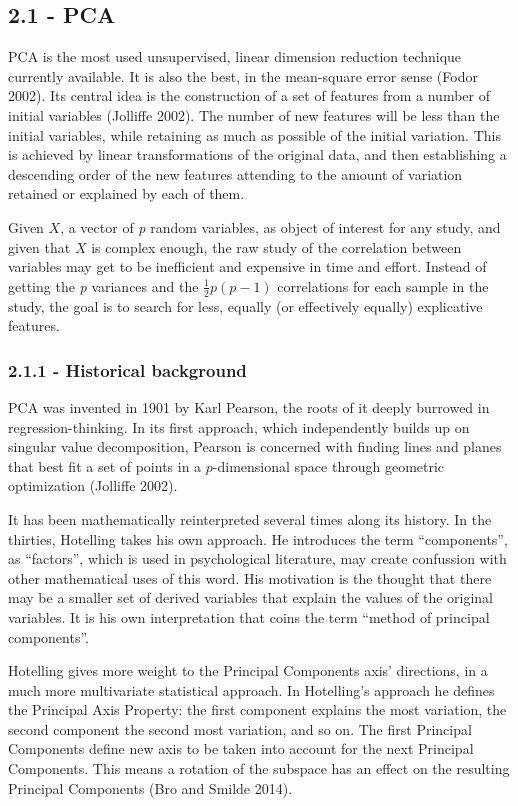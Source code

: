 \documentclass[]{article}
\begin{document}
\subsection{2.1 - PCA}\label{pca}

PCA is the most used unsupervised, linear dimension reduction technique
currently available. It is also the best, in the mean-square error sense
(Fodor 2002). Its central idea is the construction of a set of features
from a number of initial variables (Jolliffe 2002). The number of new
features will be less than the initial variables, while retaining as
much as possible of the initial variation. This is achieved by linear
transformations of the original data, and then establishing a descending
order of the new features attending to the amount of variation retained
or explained by each of them.

Given \(X\), a vector of \emph{p} random variables, as object of
interest for any study, and given that \(X\) is complex enough, the raw
study of the correlation between variables may get to be inefficient and
expensive in time and effort. Instead of getting the \emph{p} variances
and the \(\frac{1}{2}p(p -1)\) correlations for each sample in the
study, the goal is to search for less, equally (or effectively equally)
explicative features.

\subsubsection{2.1.1 - Historical
background}\label{historical-background}

PCA was invented in 1901 by Karl Pearson, the roots of it deeply
burrowed in regression-thinking. In its first approach, which
independently builds up on singular value decomposition, Pearson is
concerned with finding lines and planes that best fit a set of points in
a \(p\)-dimensional space through geometric optimization (Jolliffe
2002).

It has been mathematically reinterpreted several times along its
history. In the thirties, Hotelling takes his own approach. He
introduces the term ``components'', as ``factors'', which is used in
psychological literature, may create confussion with other mathematical
uses of this word. His motivation is the thought that there may be a
smaller set of derived variables that explain the values of the original
variables. It is his own interpretation that coins the term ``method of
principal components''.

Hotelling gives more weight to the Principal Components axis'
directions, in a much more multivariate statistical approach. In
Hotelling's approach he defines the Principal Axis Property: the first
component explains the most variation, the second component the second
most variation, and so on. The first Principal Components define new
axis to be taken into account for the next Principal Components. This
means a rotation of the subspace has an effect on the resulting
Principal Components (Bro and Smilde 2014).
\end{document}
